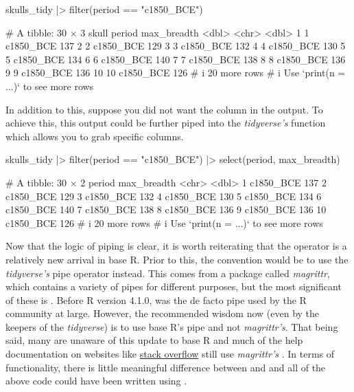 \begin{inR}
skulls_tidy |> filter(period == "c1850_BCE")
\end{inR}
\begin{outR}
# A tibble: 30 × 3
   skull period    max_breadth
   <dbl> <chr>           <dbl>
 1     1 c1850_BCE         137
 2     2 c1850_BCE         129
 3     3 c1850_BCE         132
 4     4 c1850_BCE         130
 5     5 c1850_BCE         134
 6     6 c1850_BCE         140
 7     7 c1850_BCE         138
 8     8 c1850_BCE         136
 9     9 c1850_BCE         136
10    10 c1850_BCE         126
# i 20 more rows
# i Use `print(n = ...)` to see more rows
\end{outR}

In addition to this, suppose you did not want the  column in the output. To achieve this, this output could be further piped into the \textit{tidyverse's}  function which allows you to grab specific columns.

\begin{inR}
skulls_tidy |> 
  filter(period == "c1850_BCE") |> 
  select(period, max_breadth)
\end{inR}
\begin{outR}
# A tibble: 30 × 2
   period    max_breadth
   <chr>           <dbl>
 1 c1850_BCE         137
 2 c1850_BCE         129
 3 c1850_BCE         132
 4 c1850_BCE         130
 5 c1850_BCE         134
 6 c1850_BCE         140
 7 c1850_BCE         138
 8 c1850_BCE         136
 9 c1850_BCE         136
10 c1850_BCE         126
# i 20 more rows
# i Use `print(n = ...)` to see more rows
\end{outR}

Now that the logic of piping is clear, it is worth reiterating that the \R{|>} operator is a relatively new arrival in base R. Prior to this, the convention would be to use the \textit{tidyverse's} pipe operator \R{\%>\%} instead. This comes from a package called \textit{magrittr}, which contains a variety of pipes for different purposes, but the most significant of these is \R{\%>\%}. Before R version  4.1.0, \R{\%>\%} was the de facto pipe used by the R community at large. However, the recommended wisdom now (even by the keepers of the \textit{tidyverse}) is to use base R's pipe and not \textit{magrittr's}. That being said, many are unaware of this update to base R and much of the help documentation on websites like \href{https://stackoverflow.com/}{stack overflow} still use \textit{magrittr's} \R{\%>\%}. In terms of functionality, there is little meaningful difference between \R{|>} and \R{\%>\%} and all of the above code could have been written using \R{\%>\%}.

